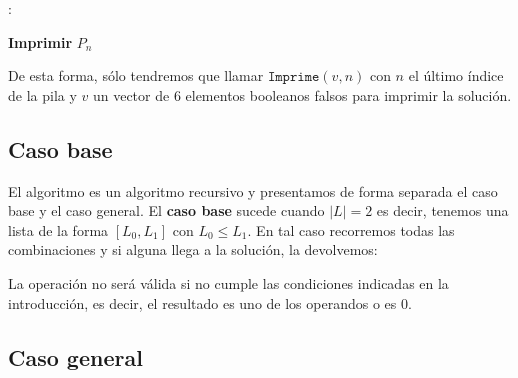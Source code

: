 \begin{algo}
: \\


	\BlankLine


	\BlankLine


  \textbf{Imprimir} $P_n$\;
\end{algo}

De esta forma, sólo tendremos que llamar $\texttt{Imprime}(v,n)$ con
$n$ el último índice de la pila y $v$ un vector de 6 elementos booleanos
falsos para imprimir la solución.

\subsection{Caso base}

El algoritmo es un algoritmo recursivo y presentamos de forma separada el caso
base y el caso general. El \textbf{caso base} sucede cuando $|L| = 2$
es decir, tenemos una lista de la forma $[L_0, L_1]$ con $L_0 \leq L_1$.
En tal caso recorremos todas las combinaciones y si alguna llega a la solución,
la devolvemos:

\begin{algo}
\end{algo}

La operación no será válida si no cumple las condiciones indicadas en la introducción,
es decir, el resultado es uno de los operandos o es 0.

\subsection{Caso general}

